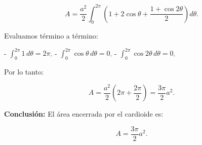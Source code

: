 {        $$
            A = \frac{a^2}{2} \int_{0}^{2\pi} \left( 1 + 2\cos\theta + \frac{1 + \cos 2\theta}{2} \right) d\theta.
        $$
    
        Evaluamos término a término:
    
        - $\int_{0}^{2\pi} 1 \, d\theta = 2\pi$.
        - $\int_{0}^{2\pi} \cos\theta \, d\theta = 0$.
        - $\int_{0}^{2\pi} \cos 2\theta \, d\theta = 0$.
    
        Por lo tanto:
    
        $$
            A = \frac{a^2}{2} \left( 2\pi + \frac{2\pi}{2} \right) = \frac{3\pi}{2} a^2.
        $$
    
        \textbf{Conclusión:}
        El área encerrada por el cardioide es:
    
        $$
            A = \frac{3\pi}{2} a^2.
        $$
    }
    
